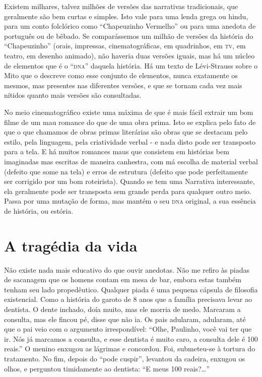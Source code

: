 Existem milhares, talvez milhões de versões das narrativas
tradicionais, que geralmente são bem curtas e simples. Isto vale para
uma lenda grega ou hindu, para um conto folclórico como “Chapeuzinho
Vermelho” ou para uma anedota de português ou de bêbado. Se
comparássemos um milhão de versões da história do “Chapeuzinho”
(orais, impressas, cinematográficas, em quadrinhos, em \textsc{tv}, em teatro,
em desenho animado), não haveria duas versões iguais, mas há um
núcleo de elementos que é o “\textsc{dna}” daquela história. Há um texto de
Lévi-Strauss sobre o Mito que o descreve como esse conjunto de
elementos, nunca exatamente os mesmos, mas presentes nas diferentes
versões, e que se tornam cada vez mais nítidos quanto mais versões
são consultadas.

No meio cinematográfico existe uma máxima de que é mais fácil extrair
um bom filme de um mau romance do que de uma obra prima. Isto se
explica pelo fato de que o que chamamos de obras primas literárias
são obras que se destacam pelo estilo, pela linguagem, pela
criatividade verbal - e nada disto pode ser transposto para a tela. E
há muitos romances maus que consistem em histórias bem imaginadas mas
escritas de maneira canhestra, com má escolha de material verbal
(defeito que some na tela) e erros de estrutura (defeito que pode
perfeitamente ser corrigido por um bom roteirista). Quando se tem uma
Narrativa interessante, ela geralmente pode ser transposta sem grande
perda para qualquer outro meio. Passa por uma mutação de forma, mas
mantém o seu \textsc{dna} original, a sua essência de história, ou estória.

\chapter{A tragédia da vida}

Não existe nada mais educativo do que ouvir anedotas. Não me refiro às
piadas de sacanagem que os homens contam em mesa de bar, embora estas
também tenham seu lado propedêutico. Qualquer piada é uma pequena
cápsula de filosofia existencial. Como a história do garoto de 8 anos
que a família precisava levar ao dentista. O dente inchado, doía
muito, mas ele morria de medo. Marcaram a consulta, mas ele fincou
pé, disse que não ia. Os pais adularam, adularam, até que o pai veio
com o argumento irrespondível: “Olhe, Paulinho, você vai ter que ir.
Nós já marcamos a consulta, e esse dentista é muito caro, a consulta
dele é 100 reais.” O menino enxugou as lágrimas e concordou. Foi,
submeteu-se à tortura do tratamento. No fim, depois do “pode cuspir”,
levantou da cadeira, enxugou os olhos, e perguntou timidamente ao
dentista: “E meus 100 reais?…”

